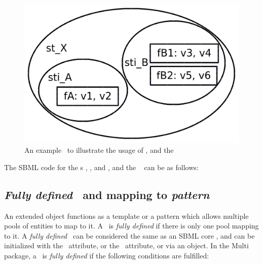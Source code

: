 \begin{figure}[htb]
  \begin{center}
    \includegraphics[scale=0.22]{./figs/diagram_ListOfSpeciesFeatures.png}
    \caption{An example \speciesFeatureType\ to illustrate the usage of \ListOfSpeciesFeatures, \SubListOfSpeciesFeatures and the \SpeciesFeature}
  \label{fig:ListOfSpeciesFeaturesExample}
  \end{center}
\end{figure}

The SBML code for the \speciesType s , , and , and the \species\  can be as follows:



\subsection{\emph{Fully defined} \species\ and mapping to \emph{pattern} \species}
\label{def:Species:FullyDefined}

An extended \ExSpecies object functions as a template or a pattern which allows multiple pools of entities to map to it. A \species\ is \emph{fully defined} if there is only one pool mapping to it. A \emph{fully defined} \species\ can be considered the same as an SBML core \species, and can be initialized with the \initialAmountAtt\ attribute, or the \initialConcentrationAtt\ attribute, or via an \InitialAssignment object. In the Multi package, a \species\ is \emph{fully defined} if the following conditions are fulfilled:

